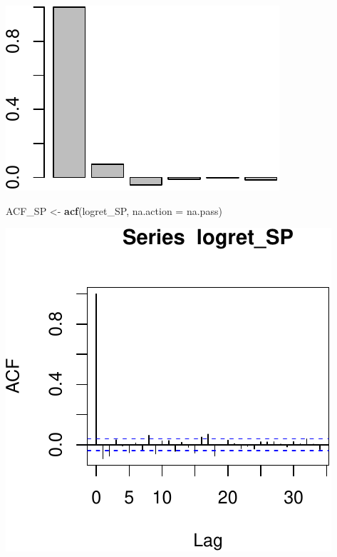 \documentclass[11pt,]{article}
\newenvironment{Shaded}{\begin{snugshade}}{\end{snugshade}}
\newcommand{\KeywordTok}[1]{\textcolor[rgb]{0.13,0.29,0.53}{\textbf{#1}}}
\newcommand{\DataTypeTok}[1]{\textcolor[rgb]{0.13,0.29,0.53}{#1}}
\newcommand{\StringTok}[1]{\textcolor[rgb]{0.31,0.60,0.02}{#1}}
\newcommand{\NormalTok}[1]{#1}
\begin{document}
\begin{center}\includegraphics{FMC_T4_PhD_ARMA_GARCH_files/figure-latex/sample_ACF_logret-2} \end{center}

\begin{Shaded}
\begin{Highlighting}[]
\NormalTok{ACF_SP <-}\StringTok{ }\KeywordTok{acf}\NormalTok{(logret_SP, }\DataTypeTok{na.action =}\NormalTok{ na.pass)}
\end{Highlighting}
\end{Shaded}

\begin{center}\includegraphics{FMC_T4_PhD_ARMA_GARCH_files/figure-latex/sample_ACF_logret-3} \end{center}
\end{document}
